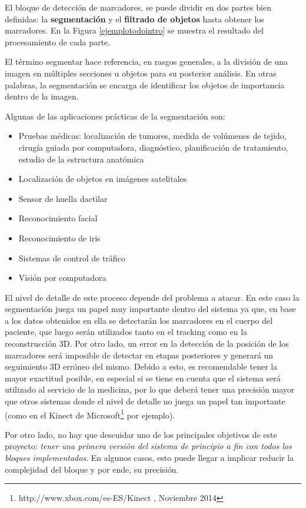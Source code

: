 El bloque de detección de marcadores, se puede dividir en dos partes bien definidas: la \textbf{segmentación} y el \textbf{filtrado de objetos} hasta obtener los marcadores. En la Figura \ref{ejemplotodointro} se muestra el resultado del procesamiento de cada parte.

El término segmentar hace referencia, en rasgos generales, a la división de una imagen en múltiples secciones u objetos para su posterior análisis. En otras palabras, la segmentación se encarga de identificar los objetos de importancia dentro de la imagen. 

Algunas de las aplicaciones prácticas de la segmentación son:
\begin{itemize}
\item Pruebas médicas: localización de tumores, medida de volúmenes de tejido, cirugía guiada por computadora, diagnóstico, planificación de tratamiento, estudio de la estructura anatómica
\item Localización de objetos en imágenes satelitales
\item Sensor de  huella dactilar
\item Reconocimiento facial
\item Reconocimiento de iris
\item Sistemas de control de tráfico
\item Visión por computadora
\end{itemize}

El nivel de detalle de este proceso depende del problema a atacar. En este caso la segmentación juega un papel muy importante dentro del sistema ya que, en base a los datos obtenidos en ella se detectarán los marcadores en el cuerpo del paciente, que luego serán utilizados tanto en el tracking como en la reconstrucción 3D. Por otro lado, un error en la detección de la posición de los marcadores será imposible de detectar en etapas posteriores y generará un seguimiento 3D erróneo del mismo. Debido a esto, es recomendable tener la mayor exactitud posible, en especial si se tiene en cuenta que el sistema será utilizado al servicio de la medicina, por lo que deberá tener una precisión mayor que otros sistemas donde el nivel de detalle no juega un papel tan importante (como en el Kinect de Microsoft\footnote{http://www.xbox.com/es-ES/Kinect , Noviembre 2014} por ejemplo).

Por otro lado, no hay que descuidar uno de los principales objetivos de este proyecto: \emph{tener una primera versión del sistema de principio a fin con todos los bloques implementados}. En algunos casos, esto puede llegar a implicar reducir la complejidad del bloque y por ende, su precisión.

